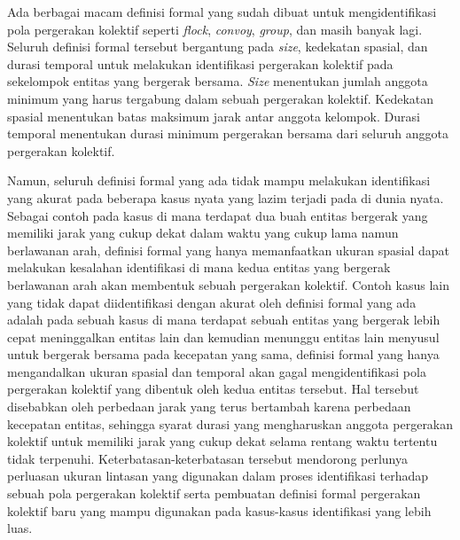 \documentclass[a4paper,twoside]{article}
\begin{document}


\fi

Ada berbagai macam definisi formal yang sudah dibuat untuk mengidentifikasi pola pergerakan kolektif seperti \textit{flock}, \textit{convoy}, \textit{group}, dan masih banyak lagi. Seluruh definisi formal tersebut bergantung pada \textit{size}, kedekatan spasial, dan durasi temporal untuk melakukan identifikasi pergerakan kolektif pada sekelompok entitas yang bergerak bersama. \textit{Size} menentukan jumlah anggota minimum yang harus tergabung dalam sebuah pergerakan kolektif. Kedekatan spasial menentukan batas maksimum jarak antar anggota kelompok. Durasi temporal menentukan durasi minimum pergerakan bersama dari seluruh anggota pergerakan kolektif.

Namun, seluruh definisi formal yang ada tidak mampu melakukan identifikasi yang akurat pada beberapa kasus nyata yang lazim terjadi pada di dunia nyata. Sebagai contoh pada kasus di mana terdapat dua buah entitas bergerak yang memiliki jarak yang cukup dekat dalam waktu yang cukup lama namun berlawanan arah, definisi formal yang hanya memanfaatkan ukuran spasial dapat melakukan kesalahan identifikasi di mana kedua entitas yang bergerak berlawanan arah akan membentuk sebuah pergerakan kolektif. Contoh kasus lain yang tidak dapat diidentifikasi dengan akurat oleh definisi formal yang ada adalah pada sebuah kasus di mana terdapat sebuah entitas yang bergerak lebih cepat meninggalkan entitas lain dan kemudian menunggu entitas lain menyusul untuk bergerak bersama pada kecepatan yang sama, definisi formal yang hanya mengandalkan ukuran spasial dan temporal akan gagal mengidentifikasi pola pergerakan kolektif yang dibentuk oleh kedua entitas tersebut. Hal tersebut disebabkan oleh perbedaan jarak yang terus bertambah karena perbedaan kecepatan entitas, sehingga syarat durasi yang mengharuskan anggota pergerakan kolektif untuk memiliki jarak yang cukup dekat selama rentang waktu tertentu tidak terpenuhi. Keterbatasan-keterbatasan tersebut mendorong perlunya perluasan ukuran lintasan yang digunakan dalam proses identifikasi terhadap sebuah pola pergerakan kolektif serta pembuatan definisi formal pergerakan kolektif baru yang mampu digunakan pada kasus-kasus identifikasi yang lebih luas. 
\end{document}

